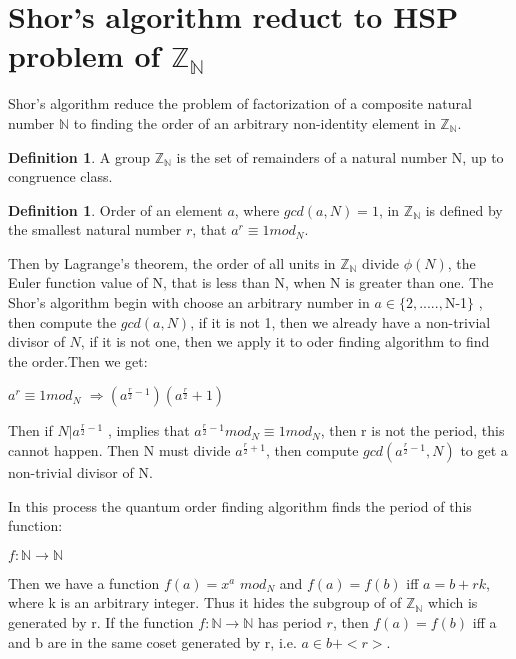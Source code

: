 \documentclass[12pt]{article}
\theoremstyle{plain}
\theoremstyle{definition}
\newtheorem{defn}[thm]{Definition} %
\begin{document}
\section{Shor's algorithm reduct to HSP problem of $\mathbb{Z_{N}}$}
  Shor's algorithm reduce the problem of  factorization of a composite natural number $\mathbb{N}$ to finding the order of an arbitrary non-identity element in $\mathbb{Z_{N}}$.  
\begin{defn}
	A group $\mathbb{Z_{N}}$ is the set of remainders of a natural number N, up to congruence class.
\end{defn}
\begin{defn}
	
	Order of an element $a$, where $gcd(a, N)=1$, in $\mathbb{Z_{N}}$ is defined by the smallest natural number $r$, that $a^{r}\equiv 1mod_{N}$.
\end{defn}
	
Then by Lagrange's theorem, the order of all units in $\mathbb{Z_{N}}$ divide $\phi(N)$, the Euler function value of N, that is less than N, when N is greater than one.
The Shor's algorithm begin with choose an arbitrary number in $a\in \{2,.....,$N-1$\}$ ,  then compute the $gcd(a, N)$, if it is not 1, then we already have a non-trivial divisor of $N$, if it is not one, then we apply it to oder finding algorithm to find the order.Then we get:
\begin{center}                      $a^{r}\equiv 1mod_{N}$
    \newline$\Rightarrow (a^{\frac{r}{2}-1})(a^{\frac{r}{2}}+1)$ 
\end{center}  
Then if $N|a^{\frac{r}{2}-1}$ , implies that $a^{\frac{r}{2}-1}mod_{N}\equiv 1mod_{N}$, then r is not the period, this cannot happen.
Then N must divide $a^{\frac{r}{2}+1}$, then compute $gcd(a^{\frac{r}{2}-1},N)$ to get a non-trivial divisor of N.

In this process the quantum order finding algorithm finds the period of this function:
\newline \begin{center}$f: \mathbb{N}\to\mathbb{N}$
\end{center}
Then we have a function $f(a)=x^{a}$ $mod_{N}$ and $f(a)=f(b)$ iff $a=b+rk$, where k is an arbitrary integer. Thus it hides the subgroup of of $\mathbb{Z_{N}}$ which is generated by r. If the function $f: \mathbb{N}\to\mathbb{N}$ has period $r$, then $f(a)=f(b)$ iff a and b are in the same coset generated by r, i.e. $a\in b+<r>$. 
\end{document}
